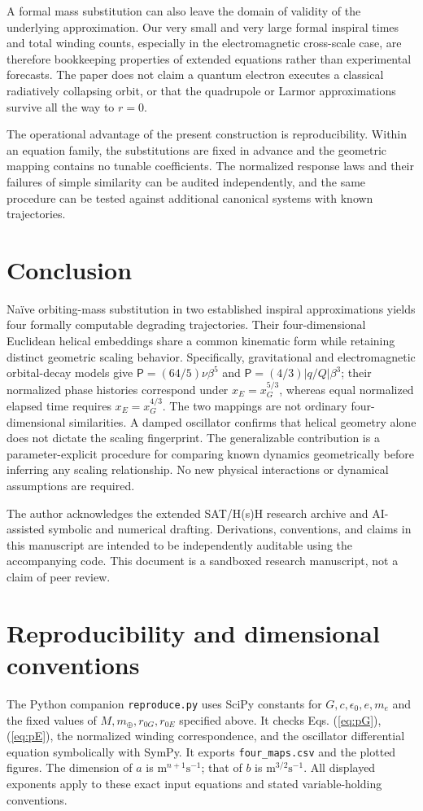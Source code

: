 \documentclass[aps,prd,reprint,onecolumn,superscriptaddress,nofootinbib]{revtex4-2}
\newcommand{\PiH}{\mathsf P}
\begin{document}
A formal mass substitution can also leave the domain of validity of the underlying approximation. Our very small and very large formal inspiral times and total winding counts, especially in the electromagnetic cross-scale case, are therefore bookkeeping properties of extended equations rather than experimental forecasts. The paper does not claim a quantum electron executes a classical radiatively collapsing orbit, or that the quadrupole or Larmor approximations survive all the way to $r=0$.

The operational advantage of the present construction is reproducibility. Within an equation family, the substitutions are fixed in advance and the geometric mapping contains no tunable coefficients. The normalized response laws and their failures of simple similarity can be audited independently, and the same procedure can be tested against additional canonical systems with known trajectories.

\section{Conclusion}
Na\"ive orbiting-mass substitution in two established inspiral approximations yields four formally computable degrading trajectories. Their four-dimensional Euclidean helical embeddings share a common kinematic form while retaining distinct geometric scaling behavior. Specifically, gravitational and electromagnetic orbital-decay models give $\PiH=(64/5)\nu\beta^5$ and $\PiH=(4/3)|q/Q|\beta^3$; their normalized phase histories correspond under $x_E=x_G^{5/3}$, whereas equal normalized elapsed time requires $x_E=x_G^{4/3}$. The two mappings are not ordinary four-dimensional similarities. A damped oscillator confirms that helical geometry alone does not dictate the scaling fingerprint. The generalizable contribution is a parameter-explicit procedure for comparing known dynamics geometrically before inferring any scaling relationship. No new physical interactions or dynamical assumptions are required.

\begin{acknowledgments}
The author acknowledges the extended SAT/H(s)H research archive and AI-assisted symbolic and numerical drafting. Derivations, conventions, and claims in this manuscript are intended to be independently auditable using the accompanying code. This document is a sandboxed research manuscript, not a claim of peer review.
\end{acknowledgments}
\appendix
\section{Reproducibility and dimensional conventions}
The Python companion \texttt{reproduce.py} uses SciPy constants for $G,c,\epsilon_0,e,m_e$ and the fixed values of $M,m_\oplus,r_{0G},r_{0E}$ specified above. It checks Eqs. (\ref{eq:pG}), (\ref{eq:pE}), the normalized winding correspondence, and the oscillator differential equation symbolically with SymPy. It exports \texttt{four\_maps.csv} and the plotted figures. The dimension of $a$ is $\mathrm m^{n+1}\mathrm s^{-1}$; that of $b$ is $\mathrm m^{3/2}\mathrm s^{-1}$. All displayed exponents apply to these exact input equations and stated variable-holding conventions.
\end{document}
